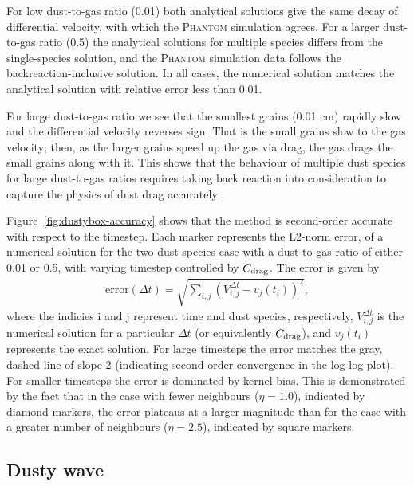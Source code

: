 \documentclass[fleqn,usenatbib]{mnras}
\begin{document}
For low dust-to-gas ratio (0.01) both analytical solutions give the same decay
of differential velocity, with which the \textsc{Phantom} simulation agrees. For
a larger dust-to-gas ratio (0.5) the analytical solutions for multiple species
differs from the single-species solution, and the \textsc{Phantom} simulation
data follows the backreaction-inclusive solution. In all cases, the numerical
solution matches the analytical solution with relative error less than 0.01.

For large dust-to-gas ratio we see that the smallest grains (0.01 cm) rapidly
slow and the differential velocity reverses sign. That is the small grains slow
to the gas velocity; then, as the larger grains speed up the gas via drag, the
gas drags the small grains along with it. This shows that the behaviour of
multiple dust species for large dust-to-gas ratios requires taking back reaction
into consideration to capture the physics of dust drag accurately
\citep{Gonzalez2017MNRAS.467.1984G,Dipierro2018MNRAS.479.4187D}.

Figure~\ref{fig:dustybox-accuracy} shows that the method is second-order
accurate with respect to the timestep. Each marker represents the L2-norm error,
of a numerical solution for the two dust species case with a dust-to-gas ratio
of either 0.01 or 0.5, with varying timestep controlled by \(C_{\rm drag}\). The
error is given by
%
\begin{align}
   \mathrm{error}(\Delta t) = \sqrt{ \sum_{i,j}
      \left(V_{i,j}^{\Delta t} - v_{j}(t_i) \right)^2 },
\end{align}
%
where the indicies i and j represent time and dust species, respectively,
\(V_{i,j}^{\Delta t}\) is the numerical solution for a particular \(\Delta t\)
(or equivalently \(C_{\rm drag}\)), and \(v_{j}(t_i)\) represents the exact
solution. For large timesteps the error matches the gray, dashed line of slope 2
(indicating second-order convergence in the log-log plot). For smaller timesteps
the error is dominated by kernel bias. This is demonstrated by the fact that in
the case with fewer neighbours (\(\eta = 1.0\)), indicated by diamond markers,
the error plateaus at a larger magnitude than for the case with a greater number
of neighbours (\(\eta = 2.5\)), indicated by square markers.

\subsection{Dusty wave}%
\label{subsec:wave}
\end{document}
